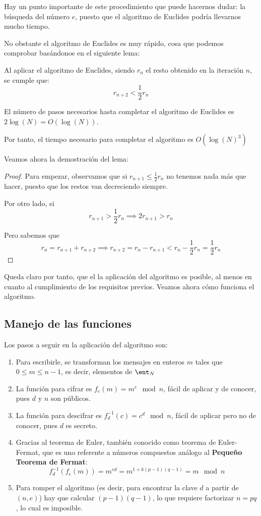 Hay un punto importante de este procedimiento que puede hacernos dudar: la búsqueda del número $e$, puesto que el algoritmo de Euclides podría llevarnos mucho tiempo.

No obstante el algoritmo de Euclides es muy rápido, cosa que podemos comprobar basándonos en el siguiente lema:
\begin{lemma}
Al aplicar el algoritmo de Euclides, siendo $r_n$ el resto obtenido en la iteración $n$, se cumple que:
\[r_{n+2} < \frac{1}{2}r_n\]
\end{lemma}
\begin{corol}
El número de pasos necesarios hasta completar el algoritmo de Euclides es $2\log(N)=O(\log(N))$.

Por tanto, el tiempo necesario para completar el algoritmo es $O(\log(N)^3)$
\end{corol}

Veamos ahora la demostración del lema:
\begin{proof}
Para empezar, observamos que si $r_{n+1} \leq \frac{1}{2}r_n$ no tenemos nada más que hacer, puesto que los restos van decreciendo siempre.

Por otro lado, si 
\[r_{n+1} > \frac{1}{2} r_n \implies 2r_{n+1} > r_n\]

Pero sabemos que 
\[r_n = r_{n+1} + r_{n+2} \implies r_{n+2} = r_n-r_{n+1} < r_n-\frac{1}{2}r_n = \frac{1}{2}r_n\] 
\end{proof}

Queda claro por tanto, que el la aplicación del algoritmo es posible, al menos en cuanto al cumplimiento de los requisitos previos. Veamos ahora cómo funciona el algoritmo.

\subsection{Manejo de las funciones}

Los pasos a seguir en la aplicación del algoritmo son:
\begin{enumerate}
\item Para escribirle, se transforman los mensajes en enteros $m$ tales que $0 \leq m \leq n-1$, es decir, elementos de $\ent_N$

\item La función para cifrar es $f_e(m)=m^e \mod n$, fácil de aplicar y de conocer, pues $d$ y $n$ son públicos.

\item La función para descifrar es $f_d^{-1}(c)=c^d \mod n$, fácil de aplicar pero no de conocer, pues $d$ es secreto.

\item Gracias al teorema de Euler, también conocido como teorema de Euler-Fermat, que es uno referente a números compuestos análogo al \textbf{Pequeño Teorema de Fermat}:
\[f_d^{-1}(f_e(m)) = m^{ed} = m^{1+k(p-1)(q-1)} = m \mod n\]

\item Para romper el algoritmo (es decir, para encontrar la clave $d$ a partir de $(n,e)$) hay que calcular $(p-1)(q-1)$, lo que requiere factorizar $n=pq$, lo cual es imposible.

\end{enumerate}

